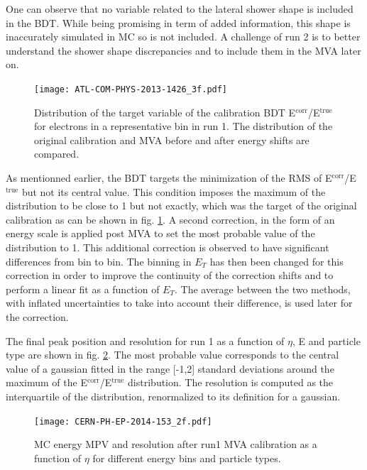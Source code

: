 One can observe that no variable related to the lateral shower shape is included in the BDT.
While being promising in term of added information, this shape is inaccurately simulated in MC so is not included.
A challenge of run 2 is to better understand the shower shape discrepancies and to include them in the MVA later on.

\begin{figure}[htbp]
\centering
\texttt{[image: ATL-COM-PHYS-2013-1426\_3f.pdf]}
\caption{\label{fig:org7143a4c}
Distribution of the target variable of the calibration BDT E\(^{\text{corr}}\)/E\(^{\text{true}}\) for electrons in a representative bin in run 1. The distribution of the original calibration and MVA before and after energy shifts are compared. \cite{ATL-COM-PHYS-2013-1426}}
\end{figure}


As mentionned earlier, the BDT targets the minimization of the RMS of E\(^{\text{corr}}\)/E\(^{\text{true}}\) but not its central value.
This condition imposes the maximum of the distribution to be close to 1 but not exactly, which was the target of the original calibration as can be shown in fig. \ref{fig:org7143a4c}.
A second correction, in the form of an energy scale is applied post MVA to set the most probable value of the distribution to 1.
This additional correction is observed to have significant differences from bin to bin.
The binning in $E_T$ has then been changed for this correction in order to improve the continuity of the correction shifts and to perform a linear fit as a function of $E_T$.
The average between the two methods, with inflated uncertainties to take into account their difference, is used later for the correction.

The final peak position and resolution for run 1 as a function of $\eta$, E and particle type are shown in fig. \ref{fig:orgd9949ea}.
The most probable value corresponds to the central value of a gaussian fitted in the range [-1,2] standard deviations around the maximum of the  E\(^{\text{corr}}\)/E\(^{\text{true}}\) distribution.
The resolution is computed as the interquartile of the distribution, renormalized to its definition for a gaussian.

\begin{figure}[htbp]
\centering
\texttt{[image: CERN-PH-EP-2014-153\_2f.pdf]}
\caption{\label{fig:orgd9949ea}
MC energy MPV and resolution after run1 MVA calibration as a function of $\eta$ for different energy bins and particle types.\cite{CERN-PH-EP-2014-153}}
\end{figure}

